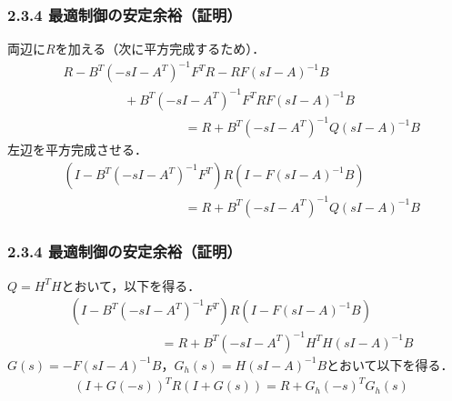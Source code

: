 \begin{frame}[t]
\frametitle{2.3.4 最適制御の安定余裕（証明）}
両辺に$R$を加える（次に平方完成するため）．
\begin{align}
	&
	R - B^T (-sI - A^T)^{-1} F^T R - R F (sI - A)^{-1} B 
\nonumber \\
	&\hspace{2cm}
	+ B^T (-sI - A^T)^{-1}F^T R F(sI - A)^{-1} B
\nonumber \\
	&\hspace{4cm}
		= R + B^T (-sI - A^T)^{-1}Q (sI - A)^{-1} B
\nonumber
\end{align}
左辺を平方完成させる．
\begin{align}
	&
	(I- B^T (-sI - A^T)^{-1}F^T) R (I - F (sI - A)^{-1} B)
\nonumber \\
	&\hspace{4cm}
		= R + B^T (-sI - A^T)^{-1}Q (sI - A)^{-1} B
\nonumber
\end{align}
\end{frame}

\begin{frame}[t]
\frametitle{2.3.4 最適制御の安定余裕（証明）}
$Q = H^T H$とおいて，以下を得る．
\begin{align}
	&
	(I- B^T (-sI - A^T)^{-1}F^T) R (I - F (sI - A)^{-1} B)
\nonumber \\
	&\hspace{3cm}
		= R + B^T (-sI - A^T)^{-1}H^T H (sI - A)^{-1} B
\label{kalman_eq}
\end{align}
$G(s)= - F (sI - A)^{-1} B$，$G_h(s)= H (sI - A)^{-1} B$とおいて以下を得る．
\begin{align}
	&
	(I+ G(-s))^T R (I + G(s))
		= R + G_h(-s)^T G_h(s)
\nonumber
\end{align}
\end{frame}

